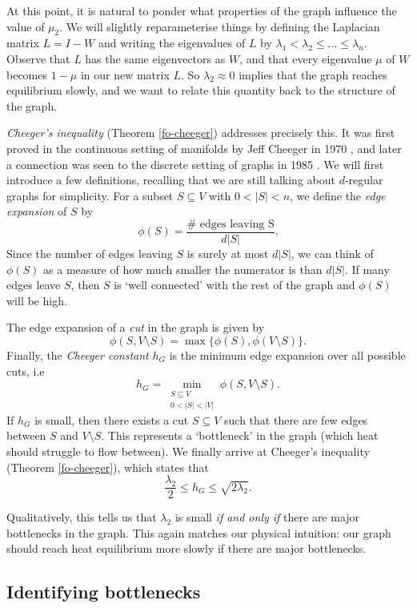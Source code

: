 \documentclass[a4paper,11pt]{article}
\theoremstyle{definition}
\begin{document}
At this point, it is natural to ponder what properties of the graph influence the value of $\mu_2$. We will slightly reparameterise things by defining the Laplacian matrix $L = I - W$ and writing the eigenvalues of $L$ by $\lambda_1 < \lambda_2 \le \dots \le \lambda_n$. Observe that $L$ has the same eigenvectors as $W$, and that every eigenvalue $\mu$ of $W$ becomes $1 - \mu$ in our new matrix $L$. So $\lambda_2 \approx 0$ implies that the graph reaches equilibrium slowly, and we want to relate this quantity back to the structure of the graph.

\emph{Cheeger's inequality} (Theorem \ref{fo-cheeger}) addresses precisely this. It was first proved in the continuous setting of manifolds by Jeff Cheeger in 1970 \cite{cheeger1970lower}, and later a connection was seen to the discrete setting of graphs in 1985 \cite{alon-milman}. We will first introduce a few definitions, recalling that we are still talking about $d$-regular graphs for simplicity. For a subset $S \subseteq V$ with $0 < |S| < n$, we define the \emph{edge expansion} of $S$ by
\[
\phi(S) = \frac{\# \text{ edges leaving S}}{d|S|}.
\]
Since the number of edges leaving $S$ is surely at most $d|S|$, we can think of $\phi(S)$ as a measure of how much smaller the numerator is than $d|S|$. If many edges leave $S$, then $S$ is `well connected' with the rest of the graph and $\phi(S)$ will be high.

The edge expansion of a \emph{cut} in the graph is given by
\[
\phi(S, V \setminus{S}) = \max\{ \phi(S), \phi(V \setminus{S})\}.
\]
Finally, the \emph{Cheeger constant} $h_G$ is the minimum edge expansion over all possible cuts, i.e
\[
h_G = \min_{\substack{S \subseteq V \\ 0 < |S| < |V|}} \phi(S, V \setminus{S}).
\]
If $h_G$ is small, then there exists a cut $S \subseteq V$ such that there are few edges between $S$ and $V \setminus{S}$. This represents a `bottleneck' in the graph (which heat should struggle to flow between). We finally arrive at Cheeger's inequality (Theorem \ref{fo-cheeger}), which states that
\[
\frac{\lambda_2}{2} \le h_G \le \sqrt{2\lambda_2}.
\]

Qualitatively, this tells us that $\lambda_2$ is small \emph{if and only if} there are major bottlenecks in the graph. This again matches our physical intuition: our graph should reach heat equilibrium more slowly if there are major bottlenecks.

\subsection{Identifying bottlenecks}
\end{document}

